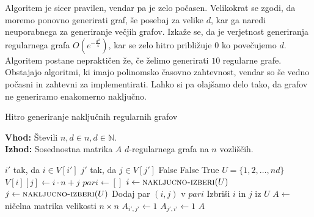 Algoritem je sicer pravilen, vendar pa je zelo počasen. Velikokrat se zgodi, da moremo ponovno generirati graf, še posebaj za velike \(d\), kar ga naredi neuporabnega za generiranje večjih grafov. Izkaže se, da je verjetnost generiranja regularnega grafa \(O(e^{-\frac{d^2}{4}})\), kar se zelo hitro približuje \(0\) ko povečujemo \(d\). Algoritem postane nepraktičen že, če želimo generirati \(10\) regularne grafe. Obstajajo algoritmi, ki imajo polinomsko časovno zahtevnost, vendar so še vedno počasni in zahtevni za implementirati. Lahko si pa olajšamo delo tako, da grafov ne generiramo enakomerno naključno\cite{STEGER_WORMALD_1999}.

\begin{algorithm}[ht]
    \caption{Hitro generiranje naključnih regularnih grafov}
    \label{enakomerno-nakljucni-hitro}
    \raggedright
    \textbf{Vhod:} Števili \(n, d \in n, d \in \mathbb N\). \\
    \textbf{Izhod:} Sosednostna matrika \(A\) \(d\)-regularnega grafa na \(n\) vozliščih.
    \begin{algorithmic}[1]
        \State \(i'\) tak, da \(i\in V[i']\)
        \State \(j'\) tak, da \(j\in V[j']\)
        \State \Return False 
        \EndIf
        \State \Return False 
        \EndIf
        \State \Return True
        \EndFunction
        \State \(U = \{1, 2, \ldots, nd\}\) 
        \State \(V[i][j] \gets i\cdot n + j\) 
        \EndFor
        \EndFor
        \State \(pari \gets []\)
        \State \(i\gets \Call{nakljucno-izberi}{U}\)
        \State \(j\gets \Call{nakljucno-izberi}{U}\)
        \State Dodaj par \((i, j)\) v \(pari\)
        \State Izbriši \(i\) in \(j\) iz \(U\)
        \EndIf
        \EndWhile
        \State \(A \gets\) ničelna matrika velikosti \(n \times n\)
        \State \(A_{i', j'} \gets 1\)
        \State \(A_{j', i'} \gets 1\)
        \EndFor
        \State \Return $A$
        \EndFunction
    \end{algorithmic}
\end{algorithm}

